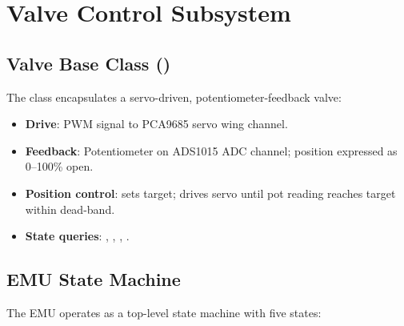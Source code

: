 ﻿\documentclass[11pt,letterpaper]{article}
\begin{document}
\section{Valve Control Subsystem}

\subsection{Valve Base Class ()}

The  class encapsulates a servo-driven, potentiometer-feedback valve:

\begin{itemize}[nosep]
  \item \textbf{Drive}: PWM signal to PCA9685 servo wing channel.
  \item \textbf{Feedback}: Potentiometer on ADS1015 ADC channel; position
        expressed as 0--100\% open.
  \item \textbf{Position control}:  sets target; 
        drives servo until pot reading reaches target within dead-band.
  \item \textbf{State queries}: , ,
        , .
\end{itemize}

\subsection{EMU State Machine}

The EMU operates as a top-level state machine with five states:
\end{document}
